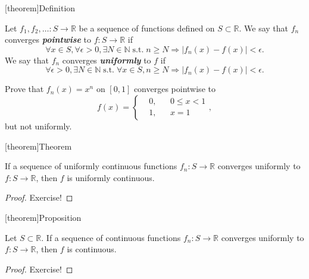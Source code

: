 \documentclass[12pt]{report}
\theoremstyle{definition}
\begin{document}
[theorem]{Definition}
\begin{function convergence}
    Let $f_1, f_2,\ldots:S\rightarrow\mathbb{R}$ be a sequence of functions
    defined on $S\subset\mathbb{R}$.
    We say that $f_n$ converges \textbf{\emph{pointwise}} to $f:S\rightarrow\mathbb{R}$
    if \[
        \forall x\in S, \forall \epsilon>0, \exists N\in\mathbb{N}
        \;\text{s.t.}\; n\ge N \Longrightarrow
        |f_n(x)-f(x)|<\epsilon.
    \] We say that $f_n$ converges \textbf{\emph{uniformly}} to $f$ if\[
        \forall \epsilon>0, \exists N\in\mathbb{N} \;\text{s.t.}\;
        \forall x\in S, n\ge N \Longrightarrow |f_n(x)-f(x)|<\epsilon.
    \]
\end{function convergence}

\begin{ex}
    Prove that $f_n(x) = x^{n}$ on $[0,1]$ converges pointwise to \[
        f(x) = \left\{\begin{align*}
            & 0, && 0 \le x < 1 \\
            & 1, && x = 1
        \end{align*}\right.,
    \]but not uniformly.
\end{ex} 

[theorem]{Theorem}
\begin{uniformly continuous function converged from}
    If a sequence of uniformly continuous functions $f_n:S\rightarrow\mathbb{R}$
    converges uniformly to $f:S\rightarrow\mathbb{R}$,
    then $f$ is uniformly continuous.
\end{uniformly continuous function converged from}

\begin{proof}
    Exercise!
\end{proof} 

[theorem]{Proposition}
\begin{continuous function converged from}
    Let $S\subset\mathbb{R}$.
    If a sequence of continuous functions $f_n:S\rightarrow\mathbb{R}$
    converges uniformly to $f:S\rightarrow\mathbb{R}$,
    then $f$ is continuous.
\end{continuous function converged from}

\begin{proof}
    Exercise!
\end{proof} 
\end{document}
